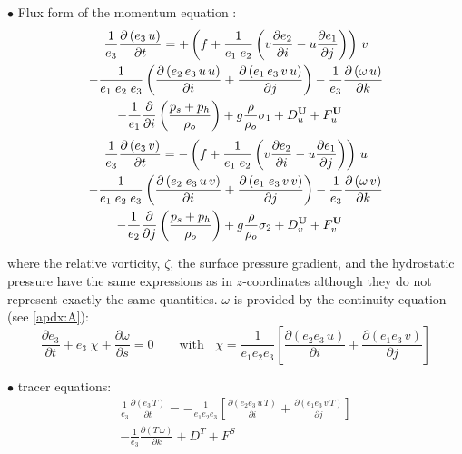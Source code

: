 \documentclass[../main/NEMO_manual]{subfiles}
\begin{document}
 \vspace{0.5cm}
$\bullet$ Flux form of the momentum equation :
\begin{multline*}
  \frac{1}{e_3} \frac{\partial \left(  e_3\,u  \right) }{\partial t}=
  +   \left( { f + \frac{1}{e_1 \; e_2 }
      \left( 	 v \frac{\partial e_2}{\partial i}
        -u \frac{\partial e_1}{\partial j} 	\right)} 	\right) \, v    \\
  - \frac{1}{e_1 \; e_2 \; e_3 } 	\left(
    \frac{\partial \left( {e_2 \, e_3 \, u\,u} \right)}{\partial i}
    +			\frac{\partial \left( {e_1 \, e_3 \, v\,u} \right)}{\partial j}	\right)
  - \frac{1}{e_3 }\frac{\partial \left( { \omega\,u} \right)}{\partial k}    \\
  - \frac{1}{e_1} \frac{\partial}{\partial i} \left( \frac{p_s + p_h}{\rho_o}    \right)
  +  g\frac{\rho }{\rho_o}\sigma_1
  +   D_u^{\mathbf{U}}  +   F_u^{\mathbf{U}} \quad
\end{multline*}
\begin{multline*}
  \frac{1}{e_3} \frac{\partial \left(  e_3\,v  \right) }{\partial t}=
  -   \left( { f + \frac{1}{e_1 \; e_2}
      \left( 	 v \frac{\partial e_2}{\partial i}
        -u \frac{\partial e_1}{\partial j} 	\right)} 	\right) \, u   \\
  - \frac{1}{e_1 \; e_2 \; e_3 } 	\left(
    \frac{\partial \left( {e_2 \; e_3  \,u\,v} \right)}{\partial i}
    +			\frac{\partial \left( {e_1 \; e_3  \,v\,v} \right)}{\partial j}	\right)
  - \frac{1}{e_3 } \frac{\partial \left( { \omega\,v} \right)}{\partial k}    \\
  -   \frac{1}{e_2 }\frac{\partial }{\partial j}\left( \frac{p_s+p_h }{\rho_o}  \right)
  +  g\frac{\rho }{\rho_o }\sigma_2
  +  D_v^{\mathbf{U}}  +   F_v^{\mathbf{U}} \quad
\end{multline*}

where the relative vorticity, \textit{$\zeta $}, the surface pressure gradient,
and the hydrostatic pressure have the same expressions as in $z$-coordinates although
they do not represent exactly the same quantities.
$\omega$ is provided by the continuity equation (see \autoref{apdx:A}):
\[
  \frac{\partial e_3}{\partial t} + e_3 \; \chi + \frac{\partial \omega }{\partial s} = 0
  \qquad \text{with }\;\;
  \chi =\frac{1}{e_1 e_2 e_3 }\left[ {\frac{\partial \left( {e_2 e_3 \,u}
        \right)}{\partial i}+\frac{\partial \left( {e_1 e_3 \,v} \right)}{\partial
        j}} \right]
\]

 \vspace{0.5cm}
$\bullet$ tracer equations:
\begin{multline*}
  \frac{1}{e_3} \frac{\partial \left(  e_3\,T  \right) }{\partial t}=
  -\frac{1}{e_1 e_2 e_3 }\left[ {\frac{\partial \left( {e_2 e_3\,u\,T} \right)}{\partial i}
      +\frac{\partial \left( {e_1 e_3\,v\,T} \right)}{\partial j}} \right]   \\
  -\frac{1}{e_3 }\frac{\partial \left( {T\,\omega } \right)}{\partial k}   + D^T + F^S   \qquad
\end{multline*}
\end{document}
